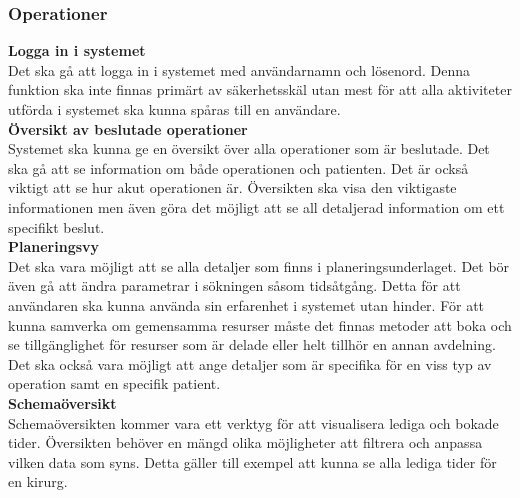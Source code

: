\documentclass[twoside]{article}
\begin{document}
\subsubsection{Operationer}
\label{subsec:Operationer}
\textbf{Logga in i systemet}\\
Det ska gå att logga in i systemet med användarnamn och lösenord. Denna
funktion ska inte finnas primärt av säkerhetsskäl utan mest för att alla
aktiviteter utförda i systemet ska kunna spåras till en användare.\\
\textbf{Översikt av beslutade operationer}\\
Systemet ska kunna ge en översikt över alla operationer som är beslutade.
Det ska gå att se information om både operationen och patienten. Det är också
viktigt att se hur akut operationen är. Översikten ska visa den viktigaste
informationen men även göra det möjligt att se all detaljerad information om ett specifikt beslut.\\
\textbf{Planeringsvy}\\
Det ska vara möjligt att se alla detaljer som finns i planeringsunderlaget.
Det bör även gå att ändra parametrar i sökningen såsom tidsåtgång. Detta för
att användaren ska kunna använda sin erfarenhet i systemet utan hinder.
För att kunna samverka om gemensamma resurser måste det finnas metoder att boka
och se tillgänglighet för resurser som är delade eller helt tillhör en annan
avdelning. Det ska också vara möjligt att ange detaljer som är specifika för en
viss typ av operation samt en specifik patient.\\
\textbf{Schemaöversikt}\\
Schemaöversikten kommer vara ett verktyg för att visualisera lediga och bokade
tider.
Översikten behöver en mängd olika möjligheter att filtrera och anpassa vilken
data som syns. Detta gäller till exempel att kunna se alla lediga tider för en
kirurg.\\
\end{document}
